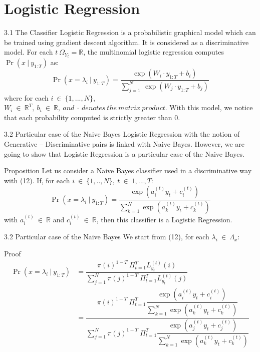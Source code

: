 \documentclass{beamer}
\providecommand{\pr}[1]{\ensuremath{\Pr\left(#1\right)}}
\begin{document}
\section{Logistic Regression}

\begin{frame}{3.1 The Classifier}
    Logistic Regression is a probabilistic graphical model which can be trained using gradient descent algorithm. It is considered as a discriminative model. For each $t\ \Omega_Y_t = \mathbb{R}$, the multinomial logistic regression computes $\pr{x\ |\ y_{1:T}}$ as:
    \begin{equation}
        \pr{x=\lambda_i\ |\ y_{1:T}} = \dfrac{\exp{(W_i \cdot y_{1:T} + b_i)}}{\sum_{j=1}^{N}\ \exp{(W_j \cdot y_{1:T} + b_j)}}
    \end{equation}
    where for each $i\ \in\ \{1,...,N\}$,\\$W_i\ \in\ \mathbb{R}^T,\ b_i\ \in\ \mathbb{R},\ and\ \cdot\ denotes\ the\ matrix\ product.$ With this
model, we notice that each probability computed is strictly greater than 0.
\end{frame}

\begin{frame}{3.2 Particular case of the Naive Bayes}
    Logistic Regression with the notion of Generative – Discriminative pairs is linked with Naive Bayes. However, we are going to show that Logistic Regression is a particular case of the Naive Bayes.\\
    \begin{block}{Proposition}
        Let us consider a Naive Bayes classifier used in a discriminative way with (12). If, for each $i\ \in\ \{1,..,N\},\ t\ \in\ 1,...,T$:
            \begin{equation}
                \pr{x=\lambda_i\ |\ y_{1:T}} = \dfrac{\exp{(a_i^{(t)}y_t + c_i^{(t)})}}{\sum_{k=1}^{N}\exp{(a_k^{(t)}y_t + c_k^{(t)})}}
            \end{equation}
        with $a_i^{(t)}\ \in\ \mathbb{R}$ and $c_i^{(t)}\ \in\ \mathbb{R}$, then this classifier is a Logistic Regression.
    \end{block}
\end{frame}

\begin{frame}{3.2 Particular case of the Naive Bayes}
    We start from (12), for each $\lambda_i\ \in\ \Lambda_x$:
    \begin{block}{Proof}
    \begin{equation}
        \begin{split}
            \pr{x=\lambda_i\ |\ y_{1:T}} &= \dfrac{\pi(i)^{1-T}\ \Pi_{t=1}^{T}L_{y_t}^{(t)}(i)}{\sum_{j=1}^{N}\pi(j)^{1-T}\ \Pi_{t=1}^{T}L_{y_t}^{(t)}(j)}\\
             &= \dfrac{\pi(i)^{1-T}\ \Pi_{t=1}^{T} \dfrac{\exp{(a_i^{(t)}y_t + c_i^{(t)})}}{\sum_{k=1}^{N}\exp{(a_k^{(t)}y_t + c_k^{(t)})}}}{\sum_{j=1}^{N}\pi(j)^{1-T}\ \Pi_{t=1}^{T}\dfrac{\exp{(a_j^{(t)}y_t + c_j^{(t)})}}{\sum_{k=1}^{N}\exp{(a_k^{(t)}y_t + c_k^{(t)})}}}\\
        \end{split}
    \end{equation}
    \end{block}
\end{frame}
\end{document}
